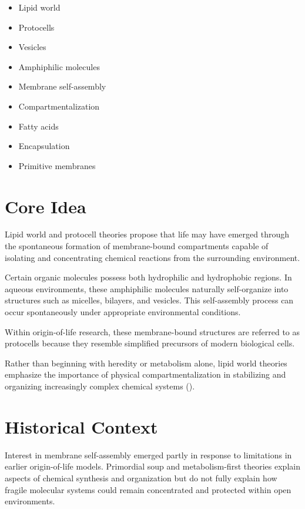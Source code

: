 \documentclass[
  oneside]{book}
\providecommand{\tightlist}{%
  \setlength{\itemsep}{0pt}\setlength{\parskip}{0pt}}
\begin{document}
\begin{itemize}
\tightlist
\item
  Lipid world
\item
  Protocells
\item
  Vesicles
\item
  Amphiphilic molecules
\item
  Membrane self-assembly
\item
  Compartmentalization
\item
  Fatty acids
\item
  Encapsulation
\item
  Primitive membranes
\end{itemize}

\section{Core Idea}\label{core-idea-3}

Lipid world and protocell theories propose that life may have emerged through the spontaneous formation of membrane-bound compartments capable of isolating and concentrating chemical reactions from the surrounding environment.

Certain organic molecules possess both hydrophilic and hydrophobic regions. In aqueous environments, these amphiphilic molecules naturally self-organize into structures such as micelles, bilayers, and vesicles. This self-assembly process can occur spontaneously under appropriate environmental conditions.

Within origin-of-life research, these membrane-bound structures are referred to as protocells because they resemble simplified precursors of modern biological cells.

Rather than beginning with heredity or metabolism alone, lipid world theories emphasize the importance of physical compartmentalization in stabilizing and organizing increasingly complex chemical systems ().

\section{Historical Context}\label{historical-context-3}

Interest in membrane self-assembly emerged partly in response to limitations in earlier origin-of-life models. Primordial soup and metabolism-first theories explain aspects of chemical synthesis and organization but do not fully explain how fragile molecular systems could remain concentrated and protected within open environments.
\end{document}
